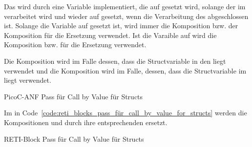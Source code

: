 Das wird durch eine Variable  implementiert, die auf  gesetzt wird, solange der  im  verarbeitet wird und wieder auf  gesetzt, wenn die Verarbeitung des  abgeschlossen ist. Solange die Variable  auf  gesetzt ist, wird immer die Komposition  bzw. der Komposition  für die Ersetzung verwendet. Ist die Varaible  auf  wird die Komposition  bzw.  für die Ersetzung verwendet.

Die Komposition  wird im Falle dessen, dass die Structvariable in den  liegt verwendet und die Komposition  wird im Falle, dessen, dass die Structvariable im  liegt verwendet.


\begin{code}
  \centering
  \caption{PicoC-ANF Pass für Call by Value für Structs}
  \label{code:picoc_mon_pass_für_call_by_value_for_structs}
\end{code}

Im  in Code~\ref{code:reti_blocks_pass_für_call_by_value_for_structs} werden die Kompositionen  und  durch ihre entsprechenden  ersetzt.

\begin{code}
  \centering
  \caption{RETI-Block Pass für Call by Value für Structs}
  \label{code:reti_blocks_pass_für_call_by_value_for_structs}
\end{code}



